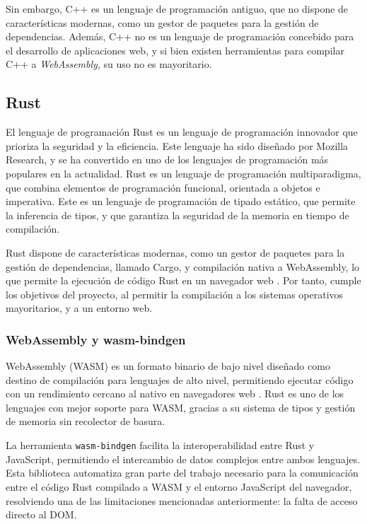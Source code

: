 Sin embargo, C++ es un lenguaje de programación antiguo, que no dispone de características modernas, como un gestor de paquetes para la gestión de dependencias. Además, C++ no es un lenguaje de programación concebido para el desarrollo de aplicaciones web, y si bien existen herramientas para compilar C++ a \textit{WebAssembly}, su uso no es mayoritario.

\subsection{Rust}
El lenguaje de programación Rust es un lenguaje de programación innovador que prioriza la seguridad y la eficiencia. Este lenguaje ha sido diseñado por Mozilla Research, y se ha convertido en uno de los lenguajes de programación más populares en la actualidad. Rust es un lenguaje de programación multiparadigma, que combina elementos de programación funcional, orientada a objetos e imperativa. Este es un lenguaje de programación de tipado estático, que permite la inferencia de tipos, y que garantiza la seguridad de la memoria en tiempo de compilación.

Rust dispone de características modernas, como un gestor de paquetes para la gestión de dependencias, llamado Cargo, y compilación nativa a WebAssembly, lo que permite la ejecución de código Rust en un navegador web \autocite{WebAssembly}. Por tanto, cumple los objetivos del proyecto, al permitir la compilación a los sistemas operativos mayoritarios, y a un entorno web.

\subsubsection{WebAssembly y wasm-bindgen}

WebAssembly (WASM) es un formato binario de bajo nivel diseñado como destino de compilación para lenguajes de alto nivel, permitiendo ejecutar código con un rendimiento cercano al nativo en navegadores web \autocite{WebAssembly}. Rust es uno de los lenguajes con mejor soporte para WASM, gracias a su sistema de tipos y gestión de memoria sin recolector de basura.

La herramienta \texttt{wasm-bindgen} \autocite{IntroductionWasmbindgenGuide} facilita la interoperabilidad entre Rust y JavaScript, permitiendo el intercambio de datos complejos entre ambos lenguajes. Esta biblioteca automatiza gran parte del trabajo necesario para la comunicación entre el código Rust compilado a WASM y el entorno JavaScript del navegador, resolviendo una de las limitaciones mencionadas anteriormente: la falta de acceso directo al DOM.

